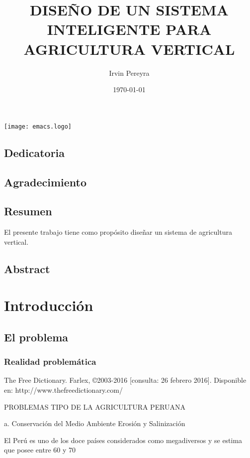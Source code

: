 \documentclass{report}
\title{DISEÑO DE UN SISTEMA INTELIGENTE PARA AGRICULTURA VERTICAL}
\author{Irvin Pereyra}
\date{\today}
\begin{document}
\maketitle
\texttt{[image: emacs.logo]}

\section{Dedicatoria}
\section{Agradecimiento}

\tableofcontents
\newpage
{}

\section{Resumen}
El presente trabajo tiene como propósito diseñar un sistema de agricultura
vertical.

\section{Abstract}

\chapter{Introducción}
\section{El problema}

\subsection{Realidad problemática}


The Free Dictionary. Farlex, ©2003-2016 [consulta: 26 febrero 2016]. Disponible en: http://www.thefreedictionary.com/

PROBLEMAS TIPO DE LA AGRICULTURA PERUANA

a. Conservación del Medio Ambiente Erosión y Salinización

El Perú es uno de los doce países considerados como megadiversos y se estima que posee entre 60 y 70%
\end{document}
